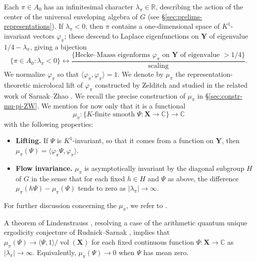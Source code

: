 \documentclass[reqno,10pt]{amsart}
\theoremstyle{plain} %
\theoremstyle{definition}
\theoremstyle{plain} %
\theoremstyle{remark}
\theoremstyle{itplain} %
\theoremstyle{remark} %
\numberwithin{equation}{section}
\DeclareMathOperator{\vol}{vol}
\def\p{{p}}
\begin{document}
Each $\pi \in A_0$ has an infinitesimal character $\lambda_\pi \in \mathbb{R}$, describing the action of the center of the universal enveloping algebra of $G$ (see \S\ref{sec:prelims-representations}).  If $\lambda_\pi < 0$, then $\pi$ contains a one-dimensional space of $K^1$-invariant vectors $\varphi_\pi$; these descend to Laplace eigenfunctions on $\mathbf{Y}$ of eigenvalue $1/4-\lambda_\pi$, giving a bijection
\[
  \{\pi \in A_0 : \lambda_\pi < 0 \} \leftrightarrow \frac{\{\text{Hecke--Maass eigenforms $\varphi_\pi$ on $\mathbf{Y}$ of eigenvalue $>1/4$}\}}{\text{scaling}}.
\]
We normalize $\varphi_\pi$ so that $\langle \varphi_\pi, \varphi_\pi \rangle = 1$.  We denote by $\mu_\pi$ the representation-theoretic microlocal lift of $\varphi_\pi$ constructed by Zelditch and studied in the related work of Sarnak--Zhao \cite{2013arXiv1303.6972S}.  We recall the precise construction of $\mu_\pi$ in \S\ref{sec:constr-mu-pi-ZW}.  We mention for now only that it is a functional
\begin{equation}\label{eq:mu-pi-first-appearance}
  \mu_\pi :
  \{
  \text{$K$-finite smooth
    $\Psi : \mathbf{X} \rightarrow \mathbb{C}$}
  \}
  \rightarrow \mathbb{C}
\end{equation}
with the following properties:
\begin{itemize}
\item {\bf Lifting.} If $\Psi$ is $K^1$-invariant, so that it comes from a function on $\mathbf{Y}$, then $\mu_\pi(\Psi) = \langle \varphi_\pi \Psi, \varphi_\pi \rangle$.
\item {\bf Flow invariance.}  $\mu_\pi$ is asymptotically invariant by the diagonal subgroup $H$ of $G$ in the sense that for each fixed $h \in H$ and $\Psi$ as above, the difference $\mu_{\pi}(h \Psi) - \mu_\pi(\Psi)$ tends to zero as $|\lambda_\pi| \rightarrow \infty$.
\end{itemize}
For further discussion concerning the $\mu_\pi$, we refer to \cite{MR916129, MR850155, MR976312, MR1838659, MR1814849, MR1859345, MR2346281, MR2314452}.

A theorem of Lindenstrauss \cite{MR2195133}, resolving a case of the arithmetic quantum unique ergodicity conjecture of Rudnick--Sarnak \cite{MR1266075}, implies that $\mu_\pi(\Psi) \rightarrow \langle \Psi, 1 \rangle / \vol(\mathbf{X})$ for each fixed continuous function $\Psi: \mathbf{X} \rightarrow \mathbb{C}$ as $|\lambda_\pi| \rightarrow \infty$.  Equivalently, $\mu_\pi(\Psi) \rightarrow 0$ when $\Psi$ has mean zero.

\end{document}

